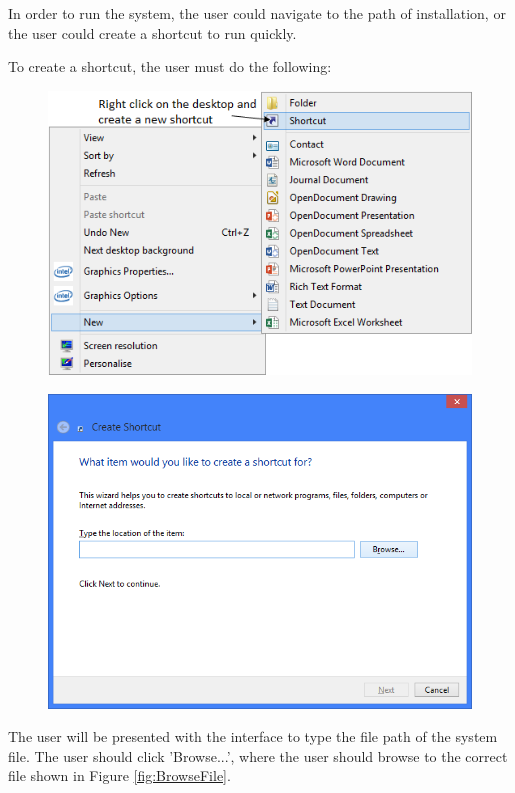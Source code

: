 In order to run the system, the user could navigate to the path of installation, or the user could create a shortcut to run quickly.

To create a shortcut, the user must do the following:

\begin{figure}[H]
    \includegraphics[width=\textwidth]{./Manual/Installation/Shortcut.png}
\end{figure}

\begin{figure}[H]
    \includegraphics[width=\textwidth]{./Manual/Installation/CreateShortcut.png}
\end{figure}

The user will be presented with the interface to type the file path of the system file. The user should click 'Browse...', where the user should browse to the correct file shown in Figure \ref{fig:BrowseFile}.

